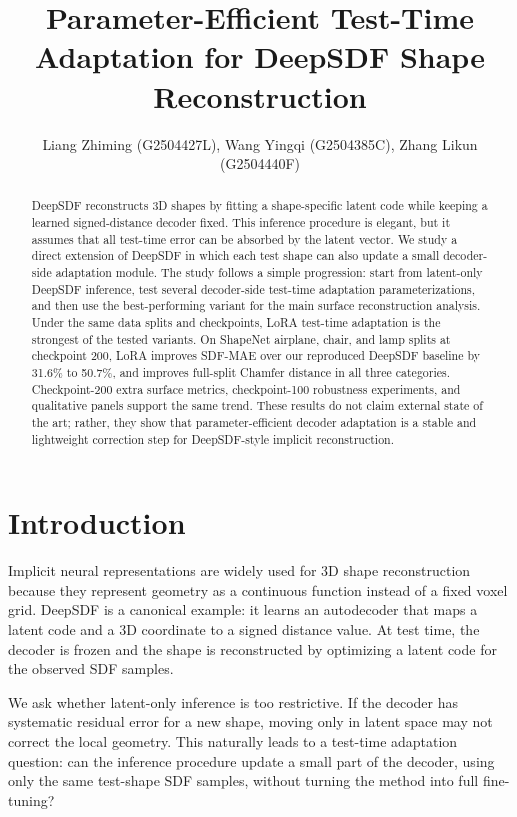 \documentclass[letterpaper]{article}
\title{Parameter-Efficient Test-Time Adaptation for DeepSDF Shape Reconstruction}
\author{
Liang Zhiming (G2504427L),
Wang Yingqi (G2504385C),
Zhang Likun (G2504440F)
}
\begin{document}
\maketitle

\begin{abstract}
DeepSDF reconstructs 3D shapes by fitting a shape-specific latent code while keeping a learned signed-distance decoder fixed. This inference procedure is elegant, but it assumes that all test-time error can be absorbed by the latent vector. We study a direct extension of DeepSDF in which each test shape can also update a small decoder-side adaptation module. The study follows a simple progression: start from latent-only DeepSDF inference, test several decoder-side test-time adaptation parameterizations, and then use the best-performing variant for the main surface reconstruction analysis. Under the same data splits and checkpoints, LoRA test-time adaptation is the strongest of the tested variants. On ShapeNet airplane, chair, and lamp splits at checkpoint 200, LoRA improves SDF-MAE over our reproduced DeepSDF baseline by 31.6\% to 50.7\%, and improves full-split Chamfer distance in all three categories. Checkpoint-200 extra surface metrics, checkpoint-100 robustness experiments, and qualitative panels support the same trend. These results do not claim external state of the art; rather, they show that parameter-efficient decoder adaptation is a stable and lightweight correction step for DeepSDF-style implicit reconstruction.
\end{abstract}

\section{Introduction}

Implicit neural representations are widely used for 3D shape reconstruction because they represent geometry as a continuous function instead of a fixed voxel grid. DeepSDF \cite{deepsdf} is a canonical example: it learns an autodecoder that maps a latent code and a 3D coordinate to a signed distance value. At test time, the decoder is frozen and the shape is reconstructed by optimizing a latent code for the observed SDF samples.

We ask whether latent-only inference is too restrictive. If the decoder has systematic residual error for a new shape, moving only in latent space may not correct the local geometry. This naturally leads to a test-time adaptation question: can the inference procedure update a small part of the decoder, using only the same test-shape SDF samples, without turning the method into full fine-tuning?
\end{document}
